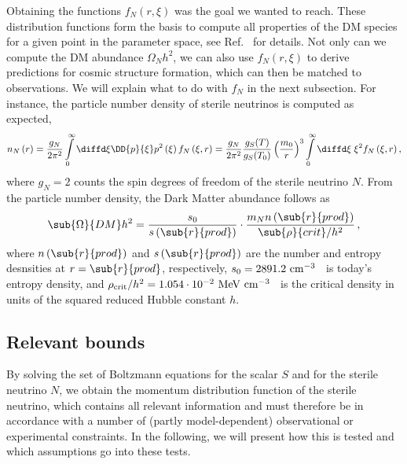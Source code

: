 Obtaining the functions $f_N (r,\xi)$ was the goal we wanted to reach. These distribution functions form the basis to compute all properties of the DM species for a given point in the parameter space, see Ref.~\cite{Merle:2015oja} for details. Not only can we compute the DM abundance $\Omega_N h^2$, we can also use $f_N (r,\xi)$ to derive predictions for cosmic structure formation, which can then be matched to observations. We will explain what to do with $f_N$ in the next subsection. For instance, the particle number density of sterile neutrinos is computed as expected,
\begin{align}
 n_N\left(r\right)= \frac{g_N}{2\pi^2}\int\limits_{0}^{\infty}{\diffd \xi \DD{p}{\xi}p^2\left(\xi\right) f_N\left(\xi,r\right)} = \frac{g_N}{2\pi^2} \frac{g_S(T)}{g_S(T_0)}\left(\frac{m_0}{r}\right)^3\int\limits_{0}^{\infty}{\diffd \xi \; \xi^2 f_N\left(\xi,r\right)} \,,
\end{align}
where $g_N = 2$ counts the spin degrees of freedom of the sterile neutrino $N$. From the particle number density, the Dark Matter abundance follows as
\begin{align}
 \sub{\Omega}{DM}h^2 = \frac{s_0}{s\left(\sub{r}{prod}\right)}\cdot \frac{m_N n\left(\sub{r}{prod}\right)}{\sub{\rho}{crit}/h^2}\,,
 \label{eq:DMAbundance}
\end{align}
where $n\left(\sub{r}{prod}\right)$ and $s\left(\sub{r}{prod}\right)$ are the number and entropy desnsities at $r = \sub{r}{prod}$, respectively, $s_0 = 2891.2~{\rm cm}^{-3}$~\cite{Agashe:2014kda} is today's entropy density, and $\rho_{\rm crit}/h^2 = 1.054\cdot 10^{-2}~{\rm MeV}~{\rm cm}^{-3}$~\cite{Agashe:2014kda} is the critical density in units of the squared reduced Hubble constant $h$.

\subsection{\label{sec:Technicalities:Bounds}Relevant bounds}

By solving the set of Boltzmann equations for the scalar $S$ and for the sterile neutrino $N$, we obtain the momentum distribution function of the sterile neutrino, which contains all relevant information and must therefore be in accordance with a number of (partly model-dependent) observational or experimental constraints. In the following, we will present how this is tested and which assumptions go into these tests.

